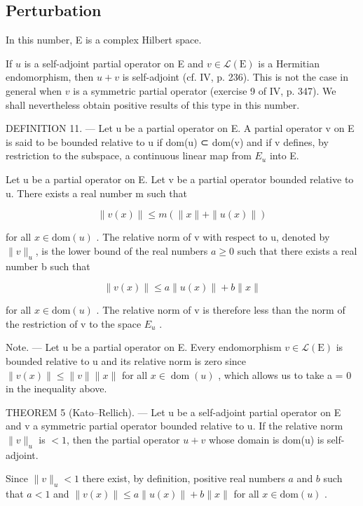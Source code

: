 \subsection{Perturbation}

In this number, E is a complex Hilbert space.

If \(u\) is a self-adjoint partial operator on E and \(v \in \mathcal{L}(\mathrm{E})\) is a Hermitian endomorphism, then \(u + v\) is self-adjoint (cf. IV, p. 236). This is not the case in general when \(v\) is a symmetric partial operator (exercise 9 of IV, p. 347). We shall nevertheless obtain positive results of this type in this number.

DEFINITION 11. --- Let u be a partial operator on E. A partial operator v on E is said to be bounded relative to u if dom(u) ⊂ dom(v) and if v defines, by restriction to the subspace, a continuous linear map from \(E_{u}\) into E.

Let u be a partial operator on E. Let v be a partial operator bounded relative to u. There exists a real number m such that

\[
\| v (x) \| \leqslant m (\| x \| + \| u (x) \|)
\]

for all \(x \in \text{dom}(u)\) . The relative norm of v with respect to u, denoted by \(\|v\|_{u}\), is the lower bound of the real numbers \(a \geqslant 0\) such that there exists a real number b such that

\[
\| v (x) \| \leqslant a \| u (x) \| + b \| x \|
\]

for all \(x \in \text{dom}(u)\) . The relative norm of v is therefore less than the norm of the restriction of v to the space \(E_{u}\) .

Note. --- Let u be a partial operator on E. Every endomorphism \(v \in \mathcal{L}(\mathrm{E})\) is bounded relative to u and its relative norm is zero since \(\|v(x)\| \leqslant \|v\|\|x\|\) for all \(x \in \operatorname{dom}(u)\) , which allows us to take a = 0 in the inequality above.

THEOREM 5 (Kato–Rellich). — Let u be a self-adjoint partial operator on E and v a symmetric partial operator bounded relative to u. If the relative norm \(\|v\|_{u}\) is \(< 1\), then the partial operator \(u + v\) whose domain is dom(u) is self-adjoint.

Since \(\| v \|_u < 1\) there exist, by definition, positive real numbers \(a\) and \(b\) such that \(a < 1\) and \(\| v(x) \| \leqslant a \| u(x) \| + b \| x \|\) for all \(x \in \text{dom}(u)\) .

